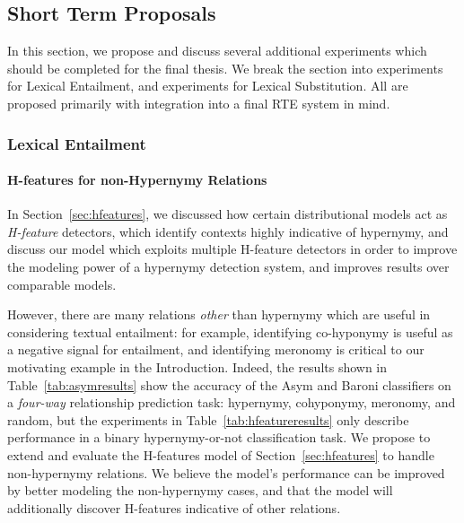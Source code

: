 \documentclass[12pt]{article}
\begin{document}
\subsection{Short Term Proposals}

In this section, we propose and discuss several additional experiments which
should be completed for the final thesis. We break the section into experiments
for Lexical Entailment, and experiments for Lexical Substitution. All are
proposed primarily with integration into a final RTE system in mind.

\subsubsection{Lexical Entailment}

\paragraph{H-features for non-Hypernymy Relations}

In Section~\ref{sec:hfeatures}, we discussed how certain distributional models
act as {\em H-feature} detectors, which identify contexts highly indicative
of hypernymy, and discuss our model which exploits
multiple H-feature detectors in order to improve the
modeling power of a hypernymy detection system, and improves results over
comparable models.

However, there are many relations {\em other} than hypernymy which are useful
in considering textual entailment: for example, identifying co-hyponymy is
useful as a negative signal for entailment, and identifying meronomy is
critical to our motivating example in the Introduction.
Indeed, the results shown in Table~\ref{tab:asymresults} show
the accuracy of the Asym and Baroni classifiers on a {\em four-way} relationship
prediction task: hypernymy, cohyponymy, meronomy, and random, but the
experiments in Table~\ref{tab:hfeatureresults} only describe performance in a
binary hypernymy-or-not classification task. We propose to extend and evaluate
the H-features model of Section~\ref{sec:hfeatures} to handle non-hypernymy
relations. We believe the model's performance can be improved by
better modeling the non-hypernymy cases, and that the model will additionally
discover H-features indicative of other relations.
\end{document}
